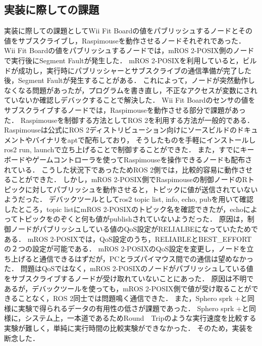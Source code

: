 \subsection{実装に際しての課題}
実装に際しての課題としてWii Fit Boardの値をパブリッシュするノードとその値をサブスクライブし，Raspimouseを動作させるノードそれぞれであった．
Wii Fit Boardの値をパブリッシュするノードでは，mROS 2-POSIX側のノードで実行後にSegment Faultが発生した．
mROS 2-POSIXを利用していると，ビルドが成功し，実行時にパブリッシャーとサブスクライブの通信準備が完了した後，Segment Faultが発生することがある．
これによって，ノードが突然動作しなくなる問題があったが，プログラムを書き直し，不正なアクセスが変数にされていないか確認しデバックすることで解決した．
Wii Fit Boardのセンサの値をサブスクライブするノードでは，Raspimouseを動作させる部分で課題があった．
Raspimouseを制御する方法としてROS 2を利用する方法が一般的である．Raspimouseは公式にROS 2ディストリビューション向けにソースビルドのドキュメントやバイナリをaptで配布しており，
そうしたものを手軽にインストールしros2 run, launchで立ち上げることで制御することができた．
また，すでにキーボードやゲームコントローラを使ってRaspimouseを操作できるノードも配布されている．
こうした状況下であったためROS 2側では，比較的容易に動作させることができた．
しかし，mROS 2-POSIX側でRaspimouseの制御ノードのRトピックに対してパブリッシュを動作させると，トピックに値が送信されていないようだった．
デバックツールとしてros2 topic list, info, echo, pubを用いて確認したところ，topic listにmROS 2-POSIXのトピック名を確認できたが，echoによってトピックをのぞくと何も値がpublishされていないようだった．
原因は，制御ノードがパブリッシュしている値のQoS設定がRELIALBEになっていたためである．
mROS 2-POSIXでは，QoS設定のうち，RELIABLEとBEST\_EFFORTの２つの設定が可能である．
mROS 2-POSIXのQoS設定を変更し，ノードを立ち上げると通信できるはずだが，PCとラズパイマウス間での通信は望めなかった．
問題はQoSではなく，mROS 2-POSIXのノードがパブリッシュしている値をサブスクライブするノードが受け取れていないことにあった．
原因は不明であるが，デバックツールを使っても，mROS 2-POSIX側で値が受け取ることができることなく，ROS 2同士では問題鳴く通信できた．
また，Sphero sprk +と同様に実験で得られるデータの有用性の低さが課題であった．
Sphero sprk +と同様に，システム上，一本道であるためRound　Tripのような実行速度を比較する実験が難しく，単純に実行時間の比較実験ができなかった．
そのため，実装を断念した．